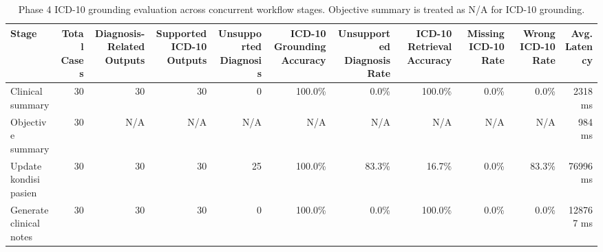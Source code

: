 \begin{table}[htbp]
\centering
\small
\begin{tabular}{l r r r r r r r r r r}
\hline
Stage & Total Cases & Diagnosis-Related Outputs & Supported ICD-10 Outputs & Unsupported Diagnosis & ICD-10 Grounding Accuracy & Unsupported Diagnosis Rate & ICD-10 Retrieval Accuracy & Missing ICD-10 Rate & Wrong ICD-10 Rate & Avg. Latency \\
\hline
Clinical summary & 30 & 30 & 30 & 0 & 100.0\% & 0.0\% & 100.0\% & 0.0\% & 0.0\% & 2318 ms \\
Objective summary & 30 & N/A & N/A & N/A & N/A & N/A & N/A & N/A & N/A & 984 ms \\
Update kondisi pasien & 30 & 30 & 30 & 25 & 100.0\% & 83.3\% & 16.7\% & 0.0\% & 83.3\% & 76996 ms \\
Generate clinical notes & 30 & 30 & 30 & 0 & 100.0\% & 0.0\% & 100.0\% & 0.0\% & 0.0\% & 128767 ms \\
\hline
\end{tabular}
\caption{Phase 4 ICD-10 grounding evaluation across concurrent workflow stages. Objective summary is treated as N/A for ICD-10 grounding.}
\label{tab:phase4-icd10-grounding}
\end{table}